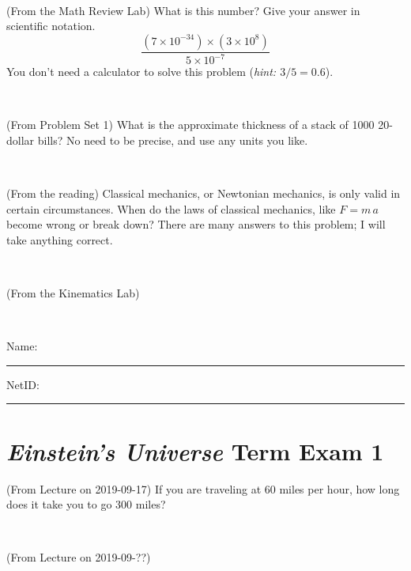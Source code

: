 \documentclass[12pt, letterpaper]{article}
\begin{document}
\vfill ~


\clearpage


\begin{problem} (From the Math Review Lab)
What is this number? Give your answer in scientific notation.
$$
\frac{(7\times10^{-34})\times(3\times10^8)}{5\times10^{-7}}
$$
You don't need a calculator to solve this problem (\textit{hint: $3/5=0.6$}).
\end{problem}


\vfill ~

\begin{problem} (From Problem Set 1)
What is the approximate thickness of a stack of 1000 20-dollar bills?
No need to be precise, and use any units you like.
\end{problem}


\vfill ~

\begin{problem} (From the reading)
Classical mechanics, or Newtonian mechanics, is only valid in certain
circumstances. When do the laws of classical mechanics, like $F =
m\,a$ become wrong or break down? There are many answers to this
problem; I will take anything correct.
\end{problem}


\vfill ~

\begin{problem} (From the Kinematics Lab)

\end{problem}


\vfill ~


\cleardoublepage



\noindent
Name: \rule[-1ex]{0.60\textwidth}{0.1pt}
NetID: \rule[-1ex]{0.20\textwidth}{0.1pt}

\section*{\textsl{Einstein's Universe} Term Exam 1}
\setcounter{problem}{1}


\begin{problem} (From Lecture on 2019-09-17)
If you are traveling at 60 miles per hour, how long does
it take you to go 300 miles?
\end{problem}


\vfill ~

\begin{problem} (From Lecture on 2019-09-??)
\end{problem}
\end{document}
